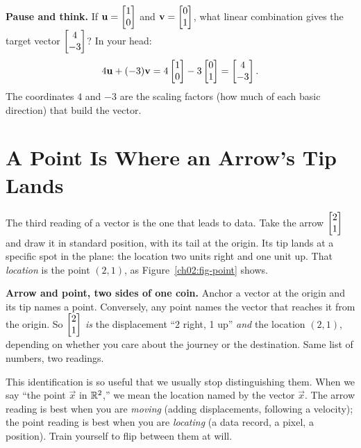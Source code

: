 \begin{recoverybox}
\textbf{Pause and think.} If $\mathbf{u}=\begin{bmatrix}1\\0\end{bmatrix}$ and $\mathbf{v}=\begin{bmatrix}0\\1\end{bmatrix}$, what linear
combination gives the target vector $\begin{bmatrix}4\\-3\end{bmatrix}$? In your head:
\[
  4\mathbf{u} + (-3)\mathbf{v} = 4\begin{bmatrix}1\\0\end{bmatrix} - 3\begin{bmatrix}0\\1\end{bmatrix} = \begin{bmatrix}4\\-3\end{bmatrix}.
\]
The coordinates $4$ and $-3$ are the scaling factors (how much of each basic direction)
that build the vector.
\end{recoverybox}

\section{A Point Is Where an Arrow's Tip Lands}
\label{ch02:point}

The third reading of a vector is the one that leads to data. Take the
arrow $\begin{bmatrix}2\\1\end{bmatrix}$ and draw it in standard position, with its tail at the origin. Its
tip lands at a specific spot in the plane: the location two units right and one unit up.
That \emph{location} is the point $(2,1)$, as Figure~\ref{ch02:fig-point} shows.

\begin{intuitionbox}
\textbf{Arrow and point, two sides of one coin.} Anchor a vector at the origin and its
tip names a point. Conversely, any point names the vector that reaches it from the origin.
So $\begin{bmatrix}2\\1\end{bmatrix}$ \emph{is} the displacement ``2 right, 1 up'' \emph{and} the location
$(2,1)$, depending on whether you care about the journey or the destination. Same list of
numbers, two readings.
\end{intuitionbox}

This identification is so useful that we usually stop distinguishing them. When we say
``the point $\vec{x}$ in $\mathbb{R}^2$,'' we mean the location named by the vector $\vec{x}$. The
arrow reading is best when you are \emph{moving} (adding displacements, following a
velocity); the point reading is best when you are \emph{locating} (a data record, a pixel,
a position). Train yourself to flip between them at will.

